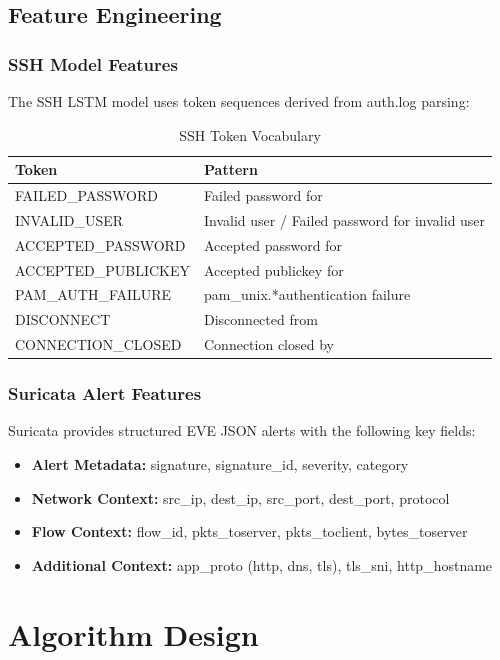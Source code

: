 \documentclass[12pt,a4paper]{report} %
\begin{document}
\subsection{Feature Engineering}

\subsubsection{SSH Model Features}
The SSH LSTM model uses token sequences derived from auth.log parsing:

\begin{table}[H]
	\centering
	\caption{SSH Token Vocabulary}
	\label{tab:ssh-tokens}
	\begin{tabular}{|l|l|}
		\hline
		\textbf{Token} & \textbf{Pattern} \\
		\hline
		FAILED\_PASSWORD & Failed password for \\
		INVALID\_USER & Invalid user / Failed password for invalid user \\
		ACCEPTED\_PASSWORD & Accepted password for \\
		ACCEPTED\_PUBLICKEY & Accepted publickey for \\
		PAM\_AUTH\_FAILURE & pam\_unix.*authentication failure \\
		DISCONNECT & Disconnected from \\
		CONNECTION\_CLOSED & Connection closed by \\
		\hline
	\end{tabular}
\end{table}

\subsubsection{Suricata Alert Features}
Suricata provides structured EVE JSON alerts with the following key fields:

\begin{itemize}
	\item \textbf{Alert Metadata:} signature, signature\_id, severity, category
	\item \textbf{Network Context:} src\_ip, dest\_ip, src\_port, dest\_port, protocol
	\item \textbf{Flow Context:} flow\_id, pkts\_toserver, pkts\_toclient, bytes\_toserver
	\item \textbf{Additional Context:} app\_proto (http, dns, tls), tls\_sni, http\_hostname
\end{itemize}

\section{Algorithm Design}
\label{sec:algorithm-design}
\end{document}
